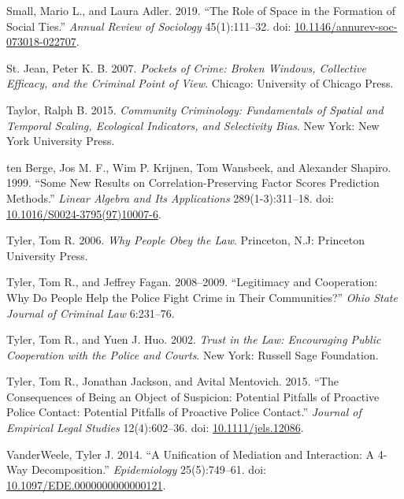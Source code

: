 \documentclass [11pt, proquest] {uwthesis}[2015/03/03]
\newlength{\cslhangindent}
\newenvironment{CSLReferences}[2]%
{\setlength{\parindent}{0pt}%
\everypar{\setlength{\hangindent}{\cslhangindent}}\ignorespaces}%
{\par}
\begin{document}
\begin{CSLReferences}{1}{0}
\leavevmode\hypertarget{ref-smallRoleSpaceFormation2019}{}%
Small, Mario L., and Laura Adler. 2019. {``The {Role} of {Space} in the {Formation} of {Social Ties}.''} \emph{Annual Review of Sociology} 45(1):111--32. doi: \href{https://doi.org/10.1146/annurev-soc-073018-022707}{10.1146/annurev-soc-073018-022707}.

\leavevmode\hypertarget{ref-st.jeanPocketsCrimeBroken2007}{}%
St. Jean, Peter K. B. 2007. \emph{Pockets of Crime: Broken Windows, Collective Efficacy, and the Criminal Point of View}. {Chicago}: {University of Chicago Press}.

\leavevmode\hypertarget{ref-taylorCommunityCriminologyFundamentals2015}{}%
Taylor, Ralph B. 2015. \emph{Community {Criminology}: {Fundamentals} of {Spatial} and {Temporal Scaling}, {Ecological Indicators}, and {Selectivity Bias}}. {New York}: {New York University Press}.

\leavevmode\hypertarget{ref-tenbergeNewResultsCorrelationpreserving1999}{}%
ten Berge, Jos M. F., Wim P. Krijnen, Tom Wansbeek, and Alexander Shapiro. 1999. {``Some New Results on Correlation-Preserving Factor Scores Prediction Methods.''} \emph{Linear Algebra and Its Applications} 289(1-3):311--18. doi: \href{https://doi.org/10.1016/S0024-3795(97)10007-6}{10.1016/S0024-3795(97)10007-6}.

\leavevmode\hypertarget{ref-tylerWhyPeopleObey2006}{}%
Tyler, Tom R. 2006. \emph{Why People Obey the Law}. {Princeton, N.J}: {Princeton University Press}.

\leavevmode\hypertarget{ref-tylerLegitimacyCooperationWhy2008}{}%
Tyler, Tom R., and Jeffrey Fagan. 2008--2009. {``Legitimacy and {Cooperation}: {Why Do People Help} the {Police Fight Crime} in {Their Communities}?''} \emph{Ohio State Journal of Criminal Law} 6:231--76.

\leavevmode\hypertarget{ref-tylerTrustLawEncouraging2002a}{}%
Tyler, Tom R., and Yuen J. Huo. 2002. \emph{Trust in the Law: Encouraging Public Cooperation with the Police and Courts}. {New York}: {Russell Sage Foundation}.

\leavevmode\hypertarget{ref-tylerConsequencesBeingObject2015}{}%
Tyler, Tom R., Jonathan Jackson, and Avital Mentovich. 2015. {``The {Consequences} of {Being} an {Object} of {Suspicion}: {Potential Pitfalls} of {Proactive Police Contact}: {Potential Pitfalls} of {Proactive Police Contact}.''} \emph{Journal of Empirical Legal Studies} 12(4):602--36. doi: \href{https://doi.org/10.1111/jels.12086}{10.1111/jels.12086}.

\leavevmode\hypertarget{ref-vanderweeleUnificationMediationInteraction2014}{}%
VanderWeele, Tyler J. 2014. {``A {Unification} of {Mediation} and {Interaction}: {A} 4-{Way Decomposition}.''} \emph{Epidemiology} 25(5):749--61. doi: \href{https://doi.org/10.1097/EDE.0000000000000121}{10.1097/EDE.0000000000000121}.


\end{CSLReferences}
\end{document}
